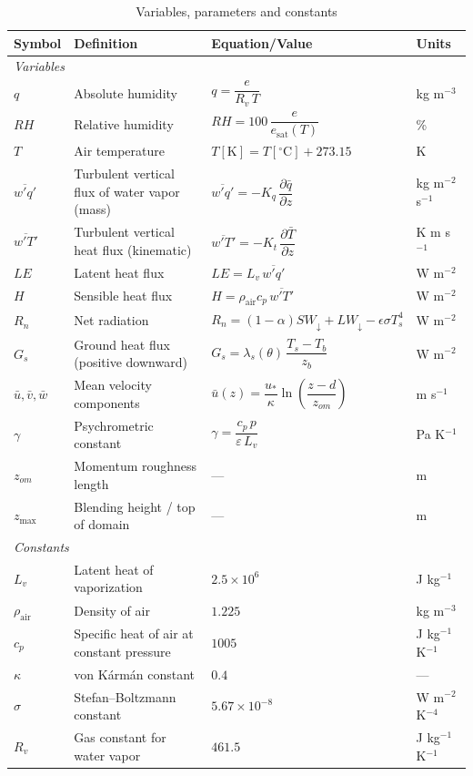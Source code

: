 \documentclass{article}
\begin{document}
    \begin{table}[t]
    \renewcommand{\arraystretch}{1.35} 
    \caption{Variables, parameters and constants}
    \centering
    \begin{tabular}{l p{6.0cm} p{5.2cm} l}
    \hline
    \textbf{Symbol} & \textbf{Definition} & \textbf{Equation/Value} & \textbf{Units} \\
    \hline
    \multicolumn{4}{l}{\textit{Variables}}\\
    \hline
    $q$ & Absolute humidity &
    $q=\dfrac{e}{R_v\,T}$ &
    kg m$^{-3}$ \\
    $RH$ & Relative humidity &
    $RH=100\,\dfrac{e}{e_{\mathrm{sat}}(T)}$ &
    \% \\
    $T$ & Air temperature &
    $T[\mathrm{K}]=T[^\circ\mathrm{C}]+273.15$ &
    K \\
    $\overline{w'q'}$ & Turbulent vertical flux of water vapor (mass) &
    $\overline{w'q'}=-K_q\,\dfrac{\partial \bar q}{\partial z}$ &
    kg m$^{-2}$ s$^{-1}$ \\
    $\overline{w'T'}$ & Turbulent vertical heat flux (kinematic) &
    $\overline{w'T'}=-K_t\,\dfrac{\partial \bar T}{\partial z}$ &
    K m s$^{-1}$ \\
    $LE$ & Latent heat flux &
    $LE=L_v\,\overline{w'q'}$ &
    W m$^{-2}$ \\
    $H$ & Sensible heat flux &
    $H=\rho_{\mathrm{air}} c_p\,\overline{w'T'}$ &
    W m$^{-2}$ \\
    $R_n$ & Net radiation &
    $R_n=(1-\alpha)SW_{\downarrow}+LW_{\downarrow}-\epsilon\sigma T_s^{4}$ &
    W m$^{-2}$ \\
    $G_s$ & Ground heat flux (positive downward) &
    $G_s=\lambda_s(\theta)\,\dfrac{T_s-T_b}{z_b}$ &
    W m$^{-2}$ \\
    $\bar u,\bar v,\bar w$ & Mean velocity components &
    $\bar u(z)=\dfrac{u_*}{\kappa}\ln\!\left(\dfrac{z-d}{z_{om}}\right)$ &
    m s$^{-1}$ \\
    $\gamma$ & Psychrometric constant & $\gamma = \dfrac{c_p\,p}{\varepsilon\,L_v}$ & Pa K$^{-1}$ \\
    $z_{om}$ & Momentum roughness length & --- & m \\
    $z_{\max}$& Blending height / top of domain & --- & m \\
    \hline
    \multicolumn{4}{l}{\textit{Constants}}\\
    \hline
    $L_v$ & Latent heat of vaporization & $2.5\times 10^{6}$ & J kg$^{-1}$ \\
    $\rho_{\mathrm{air}}$ & Density of air & $1.225$ & kg m$^{-3}$ \\
    $c_p$ & Specific heat of air at constant pressure & $1005$ & J kg$^{-1}$ K$^{-1}$ \\
    $\kappa$ & von K\'arm\'an constant & $0.4$ & --- \\
    $\sigma$ & Stefan--Boltzmann constant & $5.67\times 10^{-8}$ & W m$^{-2}$ K$^{-4}$ \\
    $R_v$ & Gas constant for water vapor & $461.5$ & J kg$^{-1}$ K$^{-1}$ \\
    \hline
    \end{tabular}
    \end{table}
    
\end{document}
